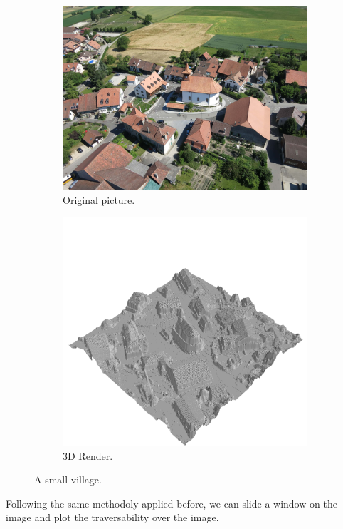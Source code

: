 \documentclass[../document.tex]{subfiles}
\begin{document}
\begin{figure}[H]
  \centering
  \begin{subfigure}[b]{0.45\textwidth}
    \includegraphics[width=\linewidth]{../img/4/traversability/sullens/sullens-original.jpg}
    \caption{Original picture.} 
  \end{subfigure}
  \begin{subfigure}[b]{0.45\textwidth}
      \includegraphics[width=\linewidth]{../img/hm3d/sullens.png}
      \caption{3D Render.} 
  \end{subfigure}
  \caption{A small village.}
\end{figure}
Following the same methodoly applied before, we can slide a window on the image and plot the traversability over the image.
\end{document}
